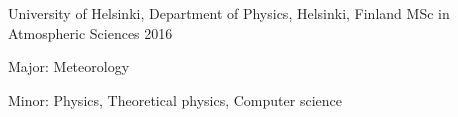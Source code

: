 

\begin{cventries}

  \cventry
    {University of Helsinki, Department of Physics, Helsinki, Finland} %
    {MSc in Atmospheric Sciences} %
    {} %
    {2016} %
    {
      \begin{cvitems} %
      	\item {Major: Meteorology}
        \item {Minor: Physics, Theoretical physics, Computer science}
      \end{cvitems}
    }

\end{cventries}

